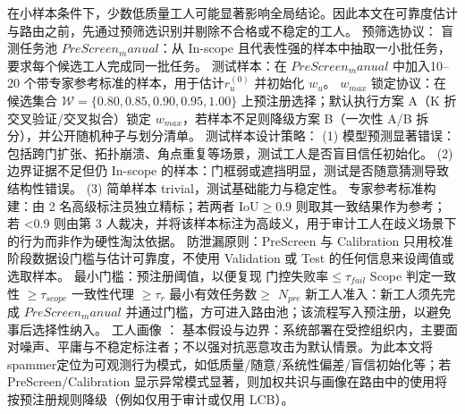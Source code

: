 \documentclass[journal,onecolumn]{IEEEtran}
\begin{document}
在小样本条件下，少数低质量工人可能显著影响全局结论。因此本文在可靠度估计与路由之前，先通过预筛选识别并剔除不合格或不稳定的工人。
预筛选协议：
盲测任务池 $PreScreen_manual$：从 In-scope 且代表性强的样本中抽取一小批任务，要求每个候选工人完成同一批任务。
测试样本：在 $PreScreen_manual$ 中加入10–20 个带专家参考标准的样本，用于估计$r_u^{\left(0\right)}$ 并初始化 $w_u$。
$w_{max}$ 锁定协议：在候选集合 $\mathcal{W}=\{0.80,0.85,0.90,0.95,1.00\}$ 上预注册选择；默认执行方案 A（K 折交叉验证/交叉拟合）锁定 $w_{max}$，若样本不足则降级方案 B（一次性 A/B 拆分），并公开随机种子与划分清单。
测试样本设计策略：
(1) 模型预测显著错误：包括跨门扩张、拓扑崩溃、角点重复等场景，测试工人是否盲目信任初始化。
(2) 边界证据不足但仍 In-scope 的样本：门框弱或遮挡明显，测试是否随意猜测导致结构性错误。
(3) 简单样本 trivial，测试基础能力与稳定性。
专家参考标准构建：由 2 名高级标注员独立精标；若两者 $\mathrm{IoU}\geq0.9$ 则取其一致结果作为参考；若 <0.9 则由第 3 人裁决，并将该样本标注为高歧义，用于审计工人在歧义场景下的行为而非作为硬性淘汰依据。
防泄漏原则：PreScreen 与 Calibration 只用校准阶段数据设门槛与估计可靠度，不使用 Validation 或 Test 的任何信息来设阈值或选取样本。
最小门槛：预注册阈值，以便复现
门控失败率$\le\tau_{fail}$
Scope 判定一致性 $\geq\tau_{scope}$
一致性代理 $\geq\tau_r$
最小有效任务数$\geq$ $N_{pre}$
新工人准入：新工人须先完成 $PreScreen_manual$ 并通过门槛，方可进入路由池；该流程写入预注册，以避免事后选择性纳入。
工人画像 ：
基本假设与边界：系统部署在受控组织内，主要面对噪声、平庸与不稳定标注者；不以强对抗恶意攻击为默认情景。为此本文将spammer定位为可观测行为模式，如低质量/随意/系统性偏差/盲信初始化等；若 PreScreen/Calibration 显示异常模式显著，则加权共识与画像在路由中的使用将按预注册规则降级（例如仅用于审计或仅用 LCB）。
\end{document}

